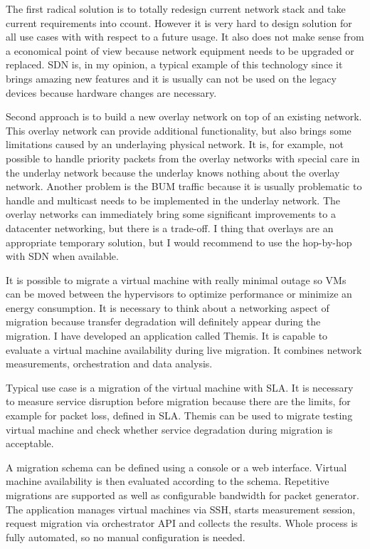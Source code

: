 The first radical solution is to totally redesign current network stack and take current requirements into ccount. However it is very hard to design solution for all use cases with with respect to a future usage. It also does not make sense from a economical point of view because network equipment needs to be upgraded or replaced. \Ac{SDN} is, in my opinion, a typical example of this technology since it brings amazing new features and it is usually can not be used on the legacy devices because hardware changes are necessary.

Second approach is to build a new overlay network on top of an existing network. This overlay network can provide additional functionality, but also brings some limitations caused by an underlaying physical network. It is, for example, not possible to handle priority packets from the overlay networks with special care in the underlay network because the underlay knows nothing about the overlay network. Another problem is the \Ac{BUM} traffic because it is usually problematic to handle and multicast needs to be implemented in the underlay network.
The overlay networks can immediately bring some significant improvements to a datacenter networking, but there is a trade-off. I thing that overlays are an appropriate temporary solution, but I would recommend to use the hop-by-hop with \Ac{SDN} when available.

It is possible to migrate a virtual machine with really minimal outage so \Ac{VM}s can be moved between the hypervisors to optimize performance or minimize an energy consumption. It is necessary to think about a networking aspect of migration because transfer degradation will definitely appear during the migration. I have developed an application called Themis. It is capable to evaluate a virtual machine availability during live migration. It combines network measurements, orchestration and data analysis.

Typical use case is a migration of the virtual machine with \Ac{SLA}. It is necessary to measure service disruption before migration because there are the limits, for example for packet loss, defined in \Ac{SLA}. Themis can be used to migrate testing virtual machine and check whether service degradation during migration is acceptable.

A migration schema can be defined using a console or a web interface. Virtual machine availability is then evaluated according to the schema. Repetitive migrations are supported as well as configurable bandwidth for packet generator. 
The application manages virtual machines via \Ac{SSH}, starts measurement session, request migration via orchestrator \Ac{API} and collects the results. Whole process is fully automated, so no manual configuration is needed. 

